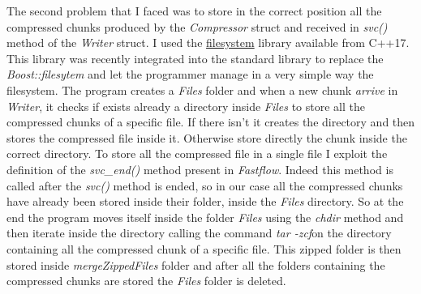 \documentclass[a4paper,10pt]{article}
\begin{document}
The second problem that I faced was to store in the correct position all the compressed chunks produced by the \textit{Compressor} struct and received in \textit{svc()} method of the \textit{Writer} struct. I used the \href{https://en.cppreference.com/w/cpp/filesystem}{filesystem} library available from C++17. This library was recently integrated into the standard library to replace the \textit{Boost::filesytem} and let the programmer manage in a very simple way the filesystem. The program creates a \textit{Files} folder and when a new chunk \textit{arrive} in \textit{Writer}, it checks if exists already a directory inside \textit{Files} to store all the compressed chunks of a specific file. If there isn't it creates the directory and then stores the compressed file inside it. Otherwise store directly the chunk inside the correct directory. To store all the compressed file in a single file I exploit the definition of the \textit{svc\_end()} method present in \textit{Fastflow}. Indeed this method is called after the \textit{svc()} method is ended, so in our case all the compressed chunks have already been stored inside their folder, inside the \textit{Files} directory. So at the end the program moves itself inside the folder \textit{Files} using the \textit{chdir} method and then iterate inside the directory calling the command \textit{tar -zcf}on the directory containing all the compressed chunk of a specific file. This zipped folder is then stored inside \textit{mergeZippedFiles} folder and after all the folders containing the compressed chunks are stored the \textit{Files} folder is deleted.
\end{document}
